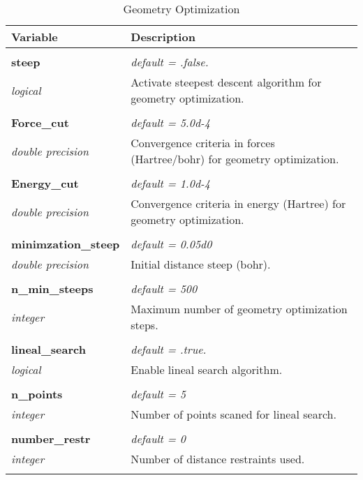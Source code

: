 \begin{Spacing}{1.0}
\begin{longtable}{ p{} p{} }

   \toprule
   \textbf{Variable} & Description \\*
   \midrule \\*
   \endhead

   \bottomrule
   \caption{Geometry Optimization}
   \endfoot

   \textbf{steep}
   &  \textit{default = .false. }
   \\*\textit{logical}
   & Activate steepest descent algorithm for geometry
   optimization.\\* \\

   \textbf{Force\_cut}
   &  \textit{default = 5.0d-4}
   \\*\textit{double precision}
   & Convergence criteria in forces (Hartree/bohr) for
   geometry optimization.\\* \\

   \textbf{Energy\_cut}
   &  \textit{default = 1.0d-4}
   \\*\textit{double precision}
   & Convergence criteria in energy (Hartree) for 
   geometry optimization.\\* \\

   \textbf{minimzation\_steep}
   &  \textit{default = 0.05d0}
   \\*\textit{double precision}
   & Initial distance steep (bohr).\\* \\

   \textbf{n\_min\_steeps}
   &  \textit{default = 500}
   \\*\textit{integer}
   & Maximum number of geometry optimization steps.\\* \\

   \textbf{lineal\_search}
   &  \textit{default = .true. }
   \\*\textit{logical}
   & Enable lineal search algorithm.\\* \\

   \textbf{n\_points}
   &  \textit{default = 5}
   \\*\textit{integer}
   & Number of points scaned for lineal search.\\* \\

   \textbf{number\_restr}
   &  \textit{default = 0}
   \\*\textit{integer}
   & Number of distance restraints used.\\* \\


\end{longtable}
\end{Spacing}
